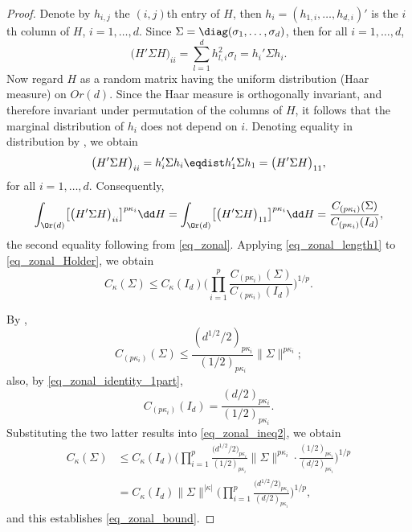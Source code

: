 \begin{proof}
Denote by $h_{i,j}$ the $(i,j)$th entry of $H$, then $h_i = (h_{1,i},\ldots,h_{d,i})'$ is the $i$th column of $H$, $i=1,\ldots,d$. Since $\Sigma = \diag(\sigma_1,\ldots,\sigma_d)$, then for all $i=1,\ldots,d$,
\[
\bigl(H'\Sigma H\bigr)_{ii} = \sum_{l=1}^d h_{l,i}^2 \sigma_l = h_i'\Sigma h_i.
\]
Now regard $H$ as a random matrix having the uniform distribution (Haar measure) on $Or(d)$. Since the Haar measure is orthogonally invariant, and therefore invariant under permutation of the columns of $H$, it follows that the marginal distribution of $h_i$ does not depend on $i$. Denoting equality in distribution by \smash{$\eqdist$}, we obtain
\[
\bigl(H'\Sigma H\bigr)_{ii} = h_i'\Sigma h_i \eqdist h_1'\Sigma h_1 = \bigl(H'\Sigma H\bigr)_{11},
\]
for all $i=1,\ldots,d$. Consequently,
\begin{equation}
\label{eq_zonal_length1}
\int_{\Or(d)} \bigl[\bigl(H'\Sigma H\bigr)_{ii}\bigr]^{p \kappa_i} \dd H = \int_{\Or(d)} \bigl[\bigl(H'\Sigma H\bigr)_{11}\bigr]^{p \kappa_i} \dd H = \frac{C_{(p \kappa_i)}(\Sigma)}{C_{(p \kappa_i)}(I_d)},
\end{equation}
the second equality following from \eqref{eq_zonal}. Applying \eqref{eq_zonal_length1} to \eqref{eq_zonal_Holder}, we obtain
\begin{equation}
\label{eq_zonal_ineq2}
C_\kappa(\Sigma) \le C_\kappa(I_d) \Bigg(\prod_{i=1}^p \frac{C_{(p \kappa_i)}(\Sigma)}{C_{(p \kappa_i)}(I_d)}\Bigg)^{1/p}.
\end{equation}

By \cite[equation~(A.10)]{BagyanRichards},
\[
C_{(p \kappa_i)}(\Sigma) \le \frac{(d^{1/2}/2)_{p \kappa_i}}{(1/2)_{p \kappa_i}} \|\Sigma\|^{p \kappa_i};
\]
also, by \eqref{eq_zonal_identity_1part},
\[
C_{(p \kappa_i)}(I_d) = \frac{(d/2)_{p \kappa_i}}{(1/2)_{p \kappa_i}}.
\]
Substituting the two latter results into \eqref{eq_zonal_ineq2}, we obtain
\begin{align*}
C_\kappa(\Sigma) &\le C_\kappa(I_d) \Bigg(\prod_{i=1}^p \frac{\bigl(d^{1/2}/2\bigr)_{p \kappa_i}}{(1/2)_{p \kappa_i}} \|\Sigma\|^{p \kappa_i} \cdot \frac{(1/2)_{p \kappa_i}}{(d/2)_{p \kappa_i}}\Bigg)^{1/p} \\
&= C_\kappa(I_d) \|\Sigma\|^{|\kappa|} \Bigg(\prod_{i=1}^p \frac{\bigl(d^{1/2}/2\bigr)_{p \kappa_i}}{(d/2)_{p \kappa_i}}\Bigg)^{1/p},
\end{align*}
and this establishes \eqref{eq_zonal_bound}.
\end{proof}
